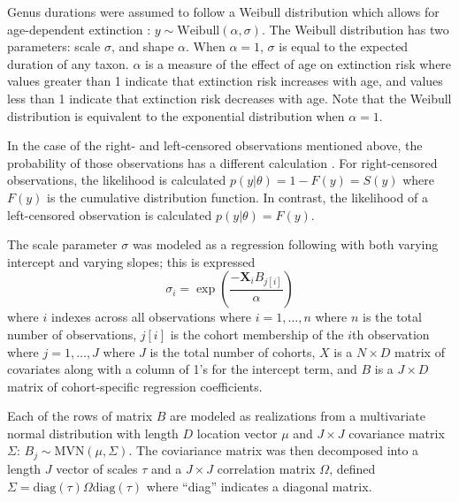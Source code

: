 \documentclass{article}
\begin{document}
Genus durations were assumed to follow a Weibull distribution which allows for age-dependent extinction \citep{Klein2003}: \(y \sim \mathrm{Weibull}(\alpha, \sigma)\). The Weibull distribution has two parameters: scale \(\sigma\), and shape \(\alpha\). When \(\alpha = 1\), \(\sigma\) is equal to the expected duration of any taxon. \(\alpha\) is a measure of the effect of age on extinction risk where values greater than 1 indicate that extinction risk increases with age, and values less than 1 indicate that extinction risk decreases with age. Note that the Weibull distribution is equivalent to the exponential distribution when \(\alpha = 1\). 

In the case of the right- and left-censored observations mentioned above, the probability of those observations has a different calculation \citep{Klein2003}. For right-censored observations, the likelihood is calculated \(p(y | \theta) = 1 - F(y) = S(y)\) where \(F(y)\) is the cumulative distribution function. In contrast, the likelihood of a left-censored observation is calculated \(p(y | \theta) = F(y)\).

The scale parameter \(\sigma\) was modeled as a regression following \citet{Kleinbaum2005} with both varying intercept and varying slopes; this is expressed
\begin{equation}
  \sigma_{i} = \exp\left(\frac{-\mathbf{X}_{i} B_{j[i]}}{\alpha}\right)
  \label{eq:sigma}
\end{equation}
where \(i\) indexes across all observations where \(i = 1, \dots, n\) where \(n\) is the total number of observations, \(j[i]\) is the cohort membership of the \(i\)th observation where \(j = 1, \dots, J\) where \(J\) is the total number of cohorts, \(X\) is a \(N \times D\) matrix of covariates along with a column of 1's for the intercept term, and \(B\) is a \(J \times D\) matrix of cohort-specific regression coefficients.

Each of the rows of matrix \(B\) are modeled as realizations from a multivariate normal distribution with length \(D\) location vector \(\mu\) and \(J \times J\) covariance matrix \(\Sigma\): \(B_{j} \sim \mathrm{MVN}(\mu, \Sigma)\). The coviariance matrix was then decomposed into a length \(J\) vector of scales \(\tau\) and a \(J \times J\) correlation matrix \(\Omega\), defined \(\Sigma = \mathrm{diag}(\tau) \Omega \mathrm{diag}(\tau)\) where ``diag'' indicates a diagonal matrix.
\end{document}
